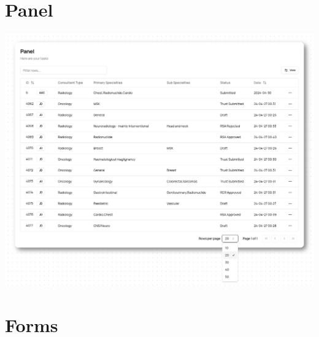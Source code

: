 \begin{appendices}
\section{Panel} \label{app:Panel}
\includegraphics[width=\textwidth]{images/panel.png}

\section{Forms}

\end{appendices}
